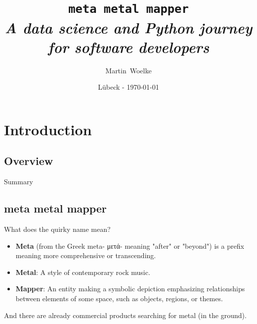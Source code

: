 \documentclass{beamer}
\title[Titel]
{
  \texttt{\huge{meta metal mapper}}\\\vspace{3 mm}
  \textit{A data science and Python journey for software developers}
}
\author[Martin Woelke]
{
  Martin~Woelke
}
\date{Lübeck - \today}
\begin{document}
\begin{frame}
  \titlepage
\end{frame}


\section{Introduction}


  \subsection{Overview}

    \begin{frame}{Summary}
      \tableofcontents
    \end{frame}

  \subsection{meta metal mapper}

    \begin{frame}{What does the quirky name mean?}
      \begin{itemize}
        \item\textbf{Meta} (from the Greek meta- \foreignlanguage{greek}{μετά}- meaning
        "after" or "beyond") is a prefix meaning more comprehensive or transcending\footnotemark.\pause
        \item\textbf{Metal}: A style of contemporary rock  music.\pause
        \item\textbf{Mapper}: An entity making a symbolic depiction emphasizing relationships
        between elements of some space, such as objects, regions, or themes.\pause
      \end{itemize}
      
      \vspace{5mm}
      
      And there are already commercial products searching for metal (in the ground).
      
      
    \end{frame}
\end{document}

